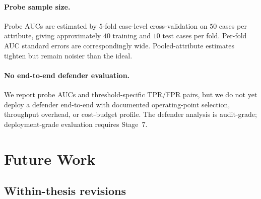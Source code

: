 \documentclass[11pt]{article}
\begin{document}
\paragraph{Probe sample size.}
Probe AUCs are estimated by $5$-fold case-level cross-validation on
$50$ cases per attribute, giving approximately $40$ training and $10$
test cases per fold. Per-fold AUC standard errors are correspondingly
wide. Pooled-attribute estimates tighten but remain noisier than the
ideal.

\paragraph{No end-to-end defender evaluation.}
We report probe AUCs and threshold-specific TPR/FPR pairs, but we do
not yet deploy a defender end-to-end with documented operating-point
selection, throughput overhead, or cost-budget profile. The defender
analysis is audit-grade; deployment-grade evaluation requires Stage~7.

\section{Future Work}
\label{sec:future}

\subsection{Within-thesis revisions}
\end{document}
